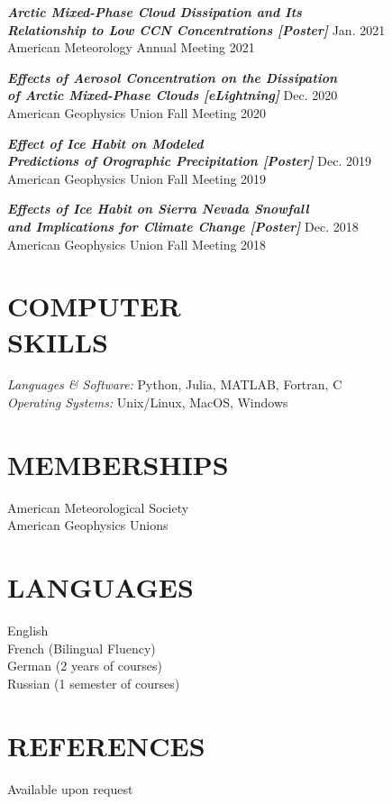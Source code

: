 \documentclass[margin]{res}
\begin{document}
\begin{resume}
                {\sl \textbf{Arctic Mixed-Phase Cloud Dissipation and Its \\ Relationship to Low CCN Concentrations [Poster]}} \hfill Jan. 2021\\
                American Meteorology Annual Meeting 2021

                {\sl \textbf{Effects of Aerosol Concentration  on the Dissipation \\ of Arctic Mixed-Phase Clouds  [eLightning]}} \hfill Dec. 2020 \\
                American Geophysics Union Fall Meeting 2020
                
                {\sl \textbf{Effect of Ice Habit on Modeled \\ Predictions of Orographic Precipitation [Poster]}} \hfill Dec. 2019 \\
                American Geophysics Union Fall Meeting 2019

                {\sl \textbf{Effects of Ice Habit on Sierra Nevada Snowfall \\ and Implications for Climate Change [Poster]}} \hfill Dec. 2018 \\
                American Geophysics Union Fall Meeting 2018
                
                \section{COMPUTER \\ SKILLS} 
                {\sl Languages \& Software:} Python, Julia, MATLAB, Fortran, C \\
                {\sl Operating Systems:} Unix/Linux, MacOS, Windows

\section{MEMBERSHIPS}            
                {American Meteorological Society} \\
                {American Geophysics Unions}

\section{LANGUAGES}
                English \\
                French (Bilingual Fluency) \\
                German (2 years of courses) \\
                Russian (1 semester of courses)

\section{REFERENCES} 
                Available upon request

\end{resume}
\end{document}
